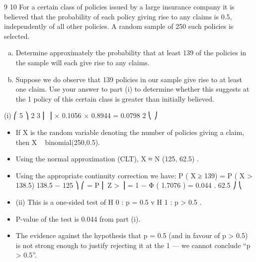 \documentclass[a4paper,12pt]{article}
\begin{document}
9
10
For a certain class of policies issued by a large insurance company it is believed that the probability of each policy giving rise to any claims is 0.5, independently of all other policies. A random sample of 250 such policies is selected.
\begin{enumerate}[(a)]
\item Determine approximately the probability that at least 139 of the policies in the sample will each give rise to any claims.
\item Suppose we do observe that 139 policies in our sample give rise to at least one
claim. Use your answer to part (i) to determine whether this suggests at the
1%
policy of this certain class is greater than initially believed.
\end{enumerate}
\newpage

(i)
⎛ 5 ⎞
2
3
⎜ ⎟ × 0.1056 × 0.8944 = 0.0798
2
⎝ ⎠

\begin{itemize}
\item If X is the random variable denoting the number of policies giving a claim,
then X ~ binomial(250,0.5).
\item Using the normal approximation (CLT), X ≈ N (125, 62.5) .
\item Using the appropriate continuity correction we have:
P ( X ≥ 139) = P ( X > 138.5)
138.5 − 125 ⎞
⎛
= P ⎜ Z >
⎟ = 1 − Φ ( 1.7076 ) = 0.044 .
62.5 ⎠
⎝
\item (ii)
This is a one-sided test of H 0 : p = 0.5 v H 1 : p > 0.5 .
\item P-value of the test is 0.044 from part (i).
\item The evidence against the hypothesis that p = 0.5 (and in favour of
p > 0.5) is not strong enough to justify rejecting it at the 1%
— we cannot conclude “p > 0.5”.
\end{itemize}
\end{document}
